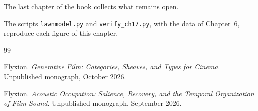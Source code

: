 \documentclass[11pt,twoside,openright]{book}
\theoremstyle{plain}
\theoremstyle{definition}
\theoremstyle{remark}
\begin{document}
The last chapter of the book collects what remains open.

The scripts \texttt{lawnmodel.py} and \texttt{verify\_ch17.py}, with the data of Chapter~6, reproduce each figure of this chapter.

\begin{thebibliography}{99}

Flyxion.
\newblock \emph{Generative Film: Categories, Sheaves, and Types for Cinema}.
\newblock Unpublished monograph, October 2026.

Flyxion.
\newblock \emph{Acoustic Occupation: Salience, Recovery, and the Temporal Organization of Film Sound}.
\newblock Unpublished monograph, September 2026.

\end{thebibliography}
\end{document}
